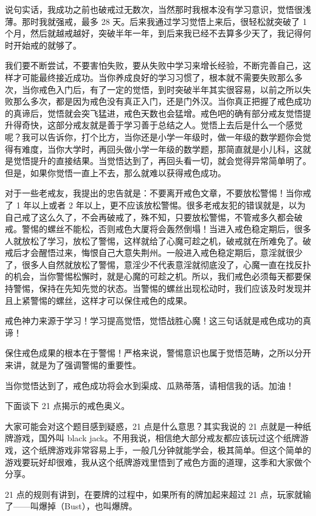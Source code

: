 \documentclass{ctexart}
\begin{document}
说句实话，我成功之前也破戒过无数次，当然那时我根本没有学习意识，觉悟很浅薄。那时我就强戒，最多 28 天。后来我通过学习觉悟上来后，很轻松就突破了 1 个月，然后就越戒越好，突破半年一年，到后来我已经不去算多少天了，我记得何时开始戒的就够了。

我们要不断尝试，不要害怕失败，要从失败中学习来增长经验，不断完善自己，这样才可能最终接近成功。当你养成良好的学习习惯了，根本就不需要失败那么多次，当你戒色入门后，有了一定的觉悟，到时突破半年其实很容易，以前之所以失败那么多次，都是因为戒色没有真正入门，还是门外汉。当你真正把握了戒色成功的真谛后，觉悟就会突飞猛进，戒色天数也会猛增。戒色吧的确有部分戒友觉悟提升得奇快，这部分戒友就是善于学习善于总结之人。觉悟上去后是什么一个感觉呢？我可以告诉你，打个比方，当你还是小学一年级时，做一年级的数学题你会觉得有难度，当你大学时，再回头做小学一年级的数学题，那简直就是小儿科，这就是觉悟提升的直接结果。当觉悟达到了，再回头看一切，就会觉得异常简单明了。但是，如果你觉悟一直上不去，那么就难以获得戒色成功。

对于一些老戒友，我提出的忠告就是：不要离开戒色文章，不要放松警惕！当你戒了 1 年以上或者 2 年以上，更不应该放松警惕。很多老戒友犯的错误就是，以为自己戒了这么久了，不会再破戒了，殊不知，只要放松警惕，不管戒多久都会破戒。警惕的螺丝不能松，否则戒色大厦将会轰然倒塌！当进入戒色稳定期后，很多人就放松了学习，放松了警惕，这样就给了心魔可趁之机，破戒就在所难免了。破戒后才会醒悟过来，悔恨自己大意失荆州。一般进入戒色稳定期后，意淫就很少了，很多人自然就放松了警惕，意淫少不代表意淫就彻底没了，心魔一直在找反扑的机会，当你警惕松懈时，就是心魔的可趁之机。所以，我们戒色必须每天都要保持警惕，保持在先知先觉的状态。当警惕的螺丝出现松动时，我们应该及时发现并且上紧警惕的螺丝，这样才可以保住戒色的成果。

戒色神力来源于学习！学习提高觉悟，觉悟战胜心魔！这三句话就是戒色成功的真谛！

保住戒色成果的根本在于警惕！严格来说，警惕意识也属于觉悟范畴，之所以分开来讲，就是为了强调警惕的重要性。

当你觉悟达到了，戒色成功将会水到渠成、瓜熟蒂落，请相信我的话。加油！

下面谈下 21 点揭示的戒色奥义。

大家可能会对这个题目感到疑惑，21 点是什么意思？其实我说的 21 点就是一种纸牌游戏，国外叫 black jack。不用我说，相信绝大部分戒友都应该玩过这个纸牌游戏，这个纸牌游戏非常容易上手，一般几分钟就能学会，极其简单。但这个简单的游戏要玩好却很难，我从这个纸牌游戏里悟到了戒色方面的道理，这季和大家做个分享。

21 点的规则有讲到，在要牌的过程中，如果所有的牌加起来超过 21 点，玩家就输了——叫爆掉（Bust），也叫爆牌。
\end{document}
